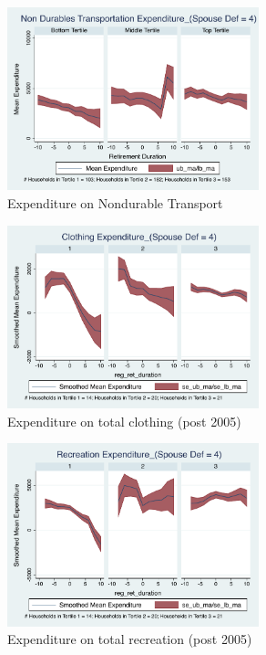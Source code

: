 \documentclass[11pt,onecolumn]{article}
\numberwithin{figure}{section}
\begin{document}
\begin{figure}[h]
	\caption{Expenditure on Nondurable Transport}
	\centering
	\includegraphics[width=0.65\textwidth]{../ConsumptionPostRetirement_by_SpouseDef_Cats/Smoothed/4/spouse_def_total_transport_real.pdf}
\end{figure}
\clearpage

\begin{figure}[h]
	\caption{Expenditure on total clothing (post 2005)}
	\centering
	\includegraphics[width=0.65\textwidth]{../ConsumptionPostRetirement_by_SpouseDef_Cats/Smoothed/4/spouse_def_total_clothing_2005_real.pdf}
\end{figure}

\begin{figure}[h]
	\caption{Expenditure on total recreation (post 2005)}
	\centering
	\includegraphics[width=0.65\textwidth]{../ConsumptionPostRetirement_by_SpouseDef_Cats/Smoothed/4/spouse_def_total_recreation_2005_real.pdf}
\end{figure}
\end{document}

